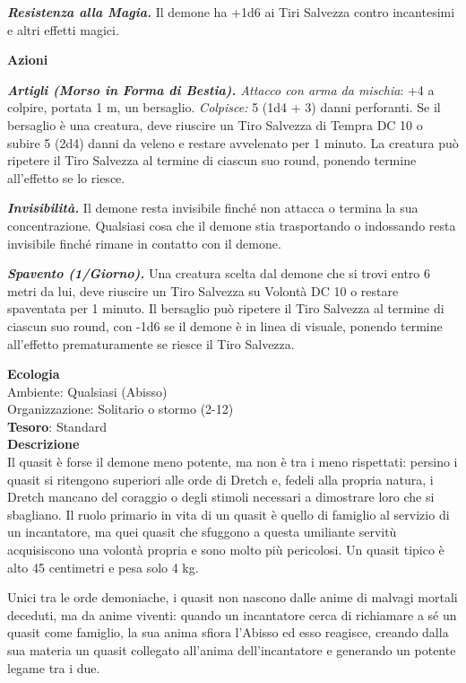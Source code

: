 \begin{multicols}{2}
\textit{\textbf{Resistenza alla Magia.}} Il demone ha +1d6 ai Tiri Salvezza contro incantesimi e altri effetti magici.

\textbf{Azioni}

\textit{\textbf{Artigli (Morso in Forma di Bestia).} Attacco con arma da mischia}: +4 a colpire, portata 1 m, un bersaglio. \textit{Colpisce:} 5 (1d4 + 3) danni perforanti. Se il bersaglio è una creatura, deve riuscire un Tiro Salvezza di Tempra DC 10 o subire 5 (2d4) danni da veleno e restare avvelenato per 1 minuto. La creatura può ripetere il Tiro Salvezza al termine di ciascun suo round, ponendo termine all'effetto se lo riesce.

\textit{\textbf{Invisibilità.}} Il demone resta invisibile finché non attacca o termina la sua concentrazione. Qualsiasi cosa che il demone stia trasportando o indossando resta invisibile finché rimane in contatto con il demone.

\textit{\textbf{Spavento (1/Giorno).}} Una creatura scelta dal demone che si trovi entro 6 metri da lui, deve riuscire un Tiro Salvezza su Volontà DC 10 o restare spaventata per 1 minuto. Il bersaglio può ripetere il Tiro Salvezza al termine di ciascun suo round, con -1d6 se il demone è in linea di visuale, ponendo termine all'effetto prematuramente se riesce il Tiro Salvezza.

\textbf{Ecologia}\\
Ambiente: Qualsiasi (Abisso)\\
Organizzazione: Solitario o stormo (2-12)\\
\textbf{Tesoro}: Standard\\
\textbf{Descrizione}\\
Il quasit è forse il demone meno potente, ma non è tra i meno rispettati: persino i quasit si ritengono superiori alle orde di Dretch e, fedeli alla propria natura, i Dretch mancano del coraggio o degli stimoli necessari a dimostrare loro che si sbagliano. Il ruolo primario in vita di un quasit è quello di famiglio al servizio di un incantatore, ma quei quasit che sfuggono a questa umiliante servitù acquisiscono una volontà propria e sono molto più pericolosi. Un quasit tipico è alto 45 centimetri e pesa solo 4 kg.

Unici tra le orde demoniache, i quasit non nascono dalle anime di malvagi mortali deceduti, ma da anime viventi: quando un incantatore cerca di richiamare a sé un quasit come famiglio, la sua anima sfiora l'Abisso ed esso reagisce, creando dalla sua materia un quasit collegato all'anima dell'incantatore e generando un potente legame tra i due.


\end{multicols}
